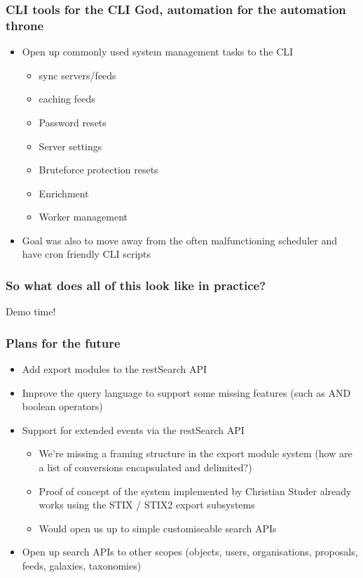 \begin{frame}
\frametitle{CLI tools for the CLI God, automation for the automation throne}
    \begin{itemize}
	\item Open up commonly used system management tasks to the CLI
        \begin{itemize}
            \item sync servers/feeds
            \item caching feeds
            \item Password resets
            \item Server settings
            \item Bruteforce protection resets
            \item Enrichment
            \item Worker management
        \end{itemize}
        \item Goal was also to move away from the often malfunctioning scheduler and have cron friendly CLI scripts
    \end{itemize}
\end{frame}

\begin{frame}
\frametitle{So what does all of this look like in practice?}
        \begin{center}
        \item Demo time!
        \end{center}
\end{frame}

\begin{frame}
\frametitle{Plans for the future}
    \begin{itemize}
	\item Add export modules to the restSearch API
        \item Improve the query language to support some missing features (such as AND boolean operators)
        \item Support for extended events via the restSearch API
	\begin{itemize}
	    \item We're missing a framing structure in the export module system (how are a list of conversions encapsulated and delimited?)
            \item Proof of concept of the system implemented by Christian Studer already works using the STIX / STIX2 export subsystems
	    \item Would open us up to simple customiseable search APIs
	\end{itemize}
	\item Open up search APIs to other scopes (objects, users, organisations, proposals, feeds, galaxies, taxonomies)
    \end{itemize}
\end{frame}
